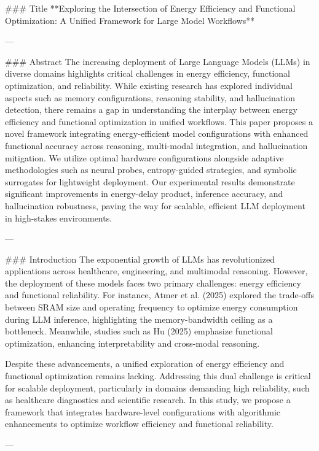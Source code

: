 ### Title  
**Exploring the Intersection of Energy Efficiency and Functional Optimization: A Unified Framework for Large Model Workflows**

---

### Abstract  
The increasing deployment of Large Language Models (LLMs) in diverse domains highlights critical challenges in energy efficiency, functional optimization, and reliability. While existing research has explored individual aspects such as memory configurations, reasoning stability, and hallucination detection, there remains a gap in understanding the interplay between energy efficiency and functional optimization in unified workflows. This paper proposes a novel framework integrating energy-efficient model configurations with enhanced functional accuracy across reasoning, multi-modal integration, and hallucination mitigation. We utilize optimal hardware configurations alongside adaptive methodologies such as neural probes, entropy-guided strategies, and symbolic surrogates for lightweight deployment. Our experimental results demonstrate significant improvements in energy-delay product, inference accuracy, and hallucination robustness, paving the way for scalable, efficient LLM deployment in high-stakes environments.  

---

### Introduction  
The exponential growth of LLMs has revolutionized applications across healthcare, engineering, and multimodal reasoning. However, the deployment of these models faces two primary challenges: energy efficiency and functional reliability. For instance, Atmer et al. (2025) explored the trade-offs between SRAM size and operating frequency to optimize energy consumption during LLM inference, highlighting the memory-bandwidth ceiling as a bottleneck. Meanwhile, studies such as Hu (2025) emphasize functional optimization, enhancing interpretability and cross-modal reasoning.

Despite these advancements, a unified exploration of energy efficiency and functional optimization remains lacking. Addressing this dual challenge is critical for scalable deployment, particularly in domains demanding high reliability, such as healthcare diagnostics and scientific research. In this study, we propose a framework that integrates hardware-level configurations with algorithmic enhancements to optimize workflow efficiency and functional reliability.

---

